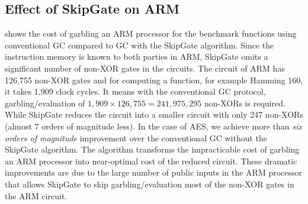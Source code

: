 \subsection{Effect of SkipGate on ARM}
\begin{table}[h]
\centering
\caption{SkipGate algorithm improvement on the ARM sequential circuit.}
\label{tab:sys_improvment_frwk}
\end{table}

 shows the cost of garbling an ARM processor for the benchmark functions using conventional GC compared to GC with the SkipGate algorithm.
Since the instruction memory is known to both parties in ARM, SkipGate omits a significant number of non-XOR gates in the circuits.
The circuit of ARM has 126,755 non-XOR gates and for computing a function, for example Hamming 160, it takes 1,909 clock cycles.
It means with the conventional GC protocol, garbling/evaluation of $1,909\times126,755=241,975,295$ non-XORs is required.
While SkipGate reduces the circuit into a smaller circuit with only 247 non-XORs (almost 7 orders of magnitude less).
In the case of AES, we achieve more than {\it six orders of magnitude} improvement over the conventional GC without the SkipGate algorithm.
The algorithm transforms the impracticable cost of garbling an ARM processor into near-optimal cost of the reduced circuit.
These dramatic improvements are due to the large number of public inputs in the ARM processor that allows SkipGate to skip garbling/evaluation most of the non-XOR gates in the ARM circuit.

